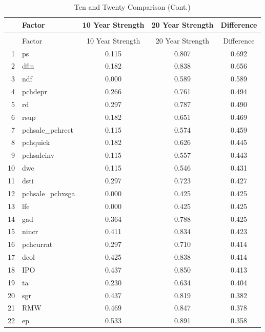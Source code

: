 \documentclass[12pt]{article}
\begin{document}
\begin{footnotesize}
	\setlength{\tabcolsep}{2pt}
	\singlespacing
	\centering					
	\begin{longtable}{rl|c|c|c}
		\caption{Ten and Twenty Comparison}\\
		
		\hline
		\hline
		& Factor & 10 Year Strength & 20 Year Strength & Difference \\ 
		\hline
		\endfirsthead
		
		\caption{Ten and Twenty Comparison (Cont.)}\\
		\hline
		\hline
		& Factor & 10 Year Strength & 20 Year Strength & Difference \\
		\hline
		\endhead
		
		\hline\hline
		\endfoot
		
		1 & ps & 0.115 & 0.807 & 0.692 \\ 
		2 & dfin & 0.182 & 0.838 & 0.656 \\ 
		3 & ndf & 0.000 & 0.589 & 0.589 \\ 
		4 & pchdepr & 0.266 & 0.761 & 0.494 \\ 
		5 & rd & 0.297 & 0.787 & 0.490 \\ 
		6 & rsup & 0.182 & 0.651 & 0.469 \\ 
		7 & pchsale\_pchrect & 0.115 & 0.574 & 0.459 \\ 
		8 & pchquick & 0.182 & 0.626 & 0.445 \\ 
		9 & pchsaleinv & 0.115 & 0.557 & 0.443 \\ 
		10 & dwc & 0.115 & 0.546 & 0.431 \\ 
		11 & dsti & 0.297 & 0.723 & 0.427 \\ 
		12 & pchsale\_pchxsga & 0.000 & 0.425 & 0.425 \\ 
		13 & lfe & 0.000 & 0.425 & 0.425 \\ 
		14 & gad & 0.364 & 0.788 & 0.425 \\ 
		15 & nincr & 0.411 & 0.834 & 0.423 \\ 
		16 & pchcurrat & 0.297 & 0.710 & 0.414 \\ 
		17 & dcol & 0.425 & 0.838 & 0.414 \\ 
		18 & IPO & 0.437 & 0.850 & 0.413 \\ 
		19 & ta & 0.230 & 0.634 & 0.404 \\ 
		20 & sgr & 0.437 & 0.819 & 0.382 \\ 
		21 & RMW & 0.469 & 0.847 & 0.378 \\ 
		22 & ep & 0.533 & 0.891 & 0.358 \\ 

\end{longtable}
\end{footnotesize}
\end{document}
